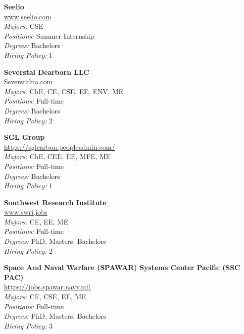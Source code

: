 \documentclass[twoside]{article}
\begin{document}
\begin{center}
\begin{multicols}{3}
\begin{minipage}{.9\columnwidth}{\Large\bf Seelio }\\
	\url{www.seelio.com}\\
	\emph{Majors:} CSE\\
	\emph{Positions:} Summer Internship\\
	\emph{Degrees:} Bachelors\\
	\emph{Hiring Policy:} 1\\
\end{minipage}
 
\begin{minipage}{.9\columnwidth}{\Large\bf Severstal Dearborn LLC }\\
	\url{Severstalna.com}\\
	\emph{Majors:} ChE, CE, CSE, EE, ENV, ME\\
	\emph{Positions:} Full-time\\
	\emph{Degrees:} Bachelors\\
	\emph{Hiring Policy:} 2\\
\end{minipage}
 
\begin{minipage}{.9\columnwidth}{\Large\bf SGL Group }\\
	\url{https://sglcarbon.peopleadmin.com/}\\
	\emph{Majors:} ChE, CEE, EE, MFE, ME\\
	\emph{Positions:} Full-time\\
	\emph{Degrees:} Bachelors\\
	\emph{Hiring Policy:} 1\\
\end{minipage}
 
\begin{minipage}{.9\columnwidth}{\Large\bf Southwest Research Institute }\\
	\url{www.swri.jobs}\\
	\emph{Majors:} CE, EE, ME\\
	\emph{Positions:} Full-time\\
	\emph{Degrees:} PhD, Masters, Bachelors\\
	\emph{Hiring Policy:} 2\\
\end{minipage}
 
\begin{minipage}{.9\columnwidth}{\Large\bf Space And Naval Warfare (SPAWAR) Systems Center Pacific (SSC PAC) }\\
	\url{https://jobs.spawar.navy.mil}\\
	\emph{Majors:} CE, CSE, EE, ME\\
	\emph{Positions:} Full-time\\
	\emph{Degrees:} PhD, Masters, Bachelors\\
	\emph{Hiring Policy:} 3\\
\end{minipage}
 

\end{multicols}
\end{center}
\end{document}
